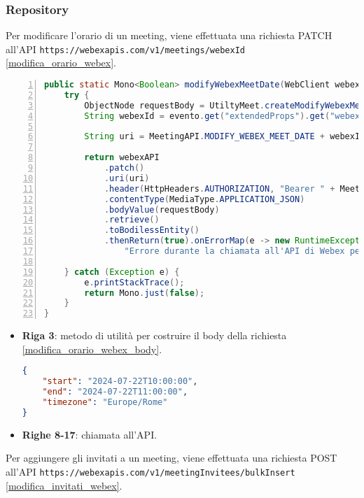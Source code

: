 \subsubsection{Repository}
Per modificare l'orario di un meeting, viene effettuata una richiesta PATCH 
all'API \texttt{https://webexapis.com/v1/meetings/webexId} \ref{modifica_orario_webex}.
\begin{lstlisting}[language=java, frame=lines, basicstyle=\ttfamily\scriptsize, numbers=left, 
	caption={chiamata all'API per modificare l'orario su Webex}, label={modifica_orario_webex}]
public static Mono<Boolean> modifyWebexMeetDate(WebClient webexAPI, JsonNode evento) {
	try {
		ObjectNode requestBody = UtiltyMeet.createModifyWebexMeetDateBody(evento);
		String webexId = evento.get("extendedProps").get("webexId").asText();

		String uri = MeetingAPI.MODIFY_WEBEX_MEET_DATE + webexId;

		return webexAPI
			.patch()
			.uri(uri)
			.header(HttpHeaders.AUTHORIZATION, "Bearer " + MeetingAPI.TOKEN)
			.contentType(MediaType.APPLICATION_JSON)
			.bodyValue(requestBody)
			.retrieve()
			.toBodilessEntity()
			.thenReturn(true).onErrorMap(e -> new RuntimeException(
				"Errore durante la chiamata all'API di Webex per la modifica di un evento", e));

	} catch (Exception e) {
		e.printStackTrace();
		return Mono.just(false);
	}
}
\end{lstlisting}
\begin{itemize}
    \item \textbf{Riga 3}: metodo di utilità per costruire il body della richiesta \ref{modifica_orario_webex_body}.
        \begin{lstlisting}[language=json, caption={body per modificare l'orario su Webex}, label={modifica_orario_webex_body}]
{
    "start": "2024-07-22T10:00:00",
    "end": "2024-07-22T11:00:00",
    "timezone": "Europe/Rome"
}
        \end{lstlisting}
    
    \item \textbf{Righe 8-17}: chiamata all'API.
\end{itemize}
Per aggiungere gli invitati a un meeting, viene effettuata una richiesta POST 
all'API \texttt{https://webexapis.com/v1/meetingInvitees/bulkInsert} \ref{modifica_invitati_webex}.
